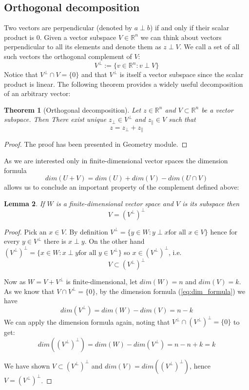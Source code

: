 \documentclass[a4paper,11pt]{article}
\theoremstyle{break}
\newtheorem{theorem}{Theorem}[section]
\newtheorem{lemma}[theorem]{Lemma}
\newcommand{\R}{\mathbb{R}}
\newcommand{\pll}{\parallel}
\begin{document}
\subsection{Orthogonal decomposition}
Two vectors are perpendicular (denoted by $ a \perp b$) if and only if their scalar product is 0. Given a vector subspace $V \in \R^n$ we can think about vectors perpendicular to all its elements and denote them as $z \perp V$. We call a set of all such vectors the orthogonal complement of $V$:
$$ V^\perp := \{ v \in \R^n : v \perp V\} $$
Notice that $V^\perp \cap V = \{0\}$ and that $V^\perp$ is itself a vector subspace since the scalar product is linear. The following theorem provides a widely useful decomposition of an arbitrary vector:

\begin{theorem}[Orthogonal decomposition] \label{thm:projection}
    Let $z \in \R^n$ and $V \subset \R^n$ be a vector subspace. Then
    There exist unique $z_\perp \in V^\perp$ and $z_\pll \in V$ such that  
    \begin{equation}
        z = z_\perp + z_\pll
    \end{equation}
\end{theorem}

\begin{proof}
    The proof has been presented in Geometry module.
\end{proof}

As we are interested only in finite-dimensional vector spaces the dimension formula
\begin{equation}\label{eq:dim_formula}
    dim(U + V) = dim(U) + dim(V) - dim( U \cap V)
\end{equation}
allows us to conclude an important property of the complement defined above:

\begin{lemma}\label{lem:double_perp}
    If $W$ is a finite-dimensional vector space and $V$ is its subspace then
    $$ V = (V^\perp)^\perp $$
\end{lemma}

\begin{proof}
    Pick an $x \in V$. By definition $ V^\perp = \{ y \in W : y \perp x \text{for all } x \in V \}$ hence for every $y \in V^\perp $ there is $x \perp y$. On the other hand $ (V^\perp)^\perp = \{ x \in W : x \perp y \text{for all } y \in V^\perp \}$ so $x \in (V^\perp)^\perp$, i.e.
    $$ V \subset (V^\perp)^\perp$$

    Now as $W = V + V^\perp$ is finite-dimensional, let $dim(W) = n$ and $dim(V) = k$. 
    As we know that $V \cap V^\perp = \{0\}$, by the dimension formula (\ref{eq:dim_formula}) we have
    $$ dim(V^\perp) = dim(W) - dim(V) = n - k $$
    We can apply the dimension formula again, noting that $ V^\perp \cap (V^\perp)^\perp = \{0\} $ to get:
    $$ dim((V^\perp)^\perp) = dim(W) - dim(V^\perp) = n - n + k = k $$

    We have shown $ V \subset (V^\perp)^\perp$ and $ dim(V) = dim((V^\perp)^\perp)$,
    hence $ V = (V^\perp)^\perp$.
\end{proof}
\end{document}
